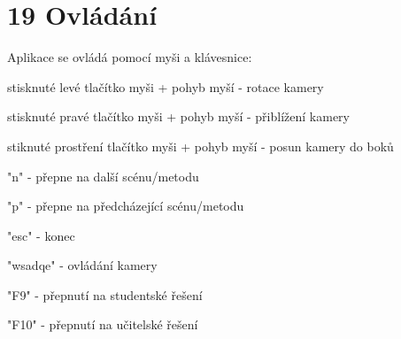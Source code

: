 \chapter{19 Ovládání}
\hypertarget{p19_ovladani}{}\label{p19_ovladani}
Aplikace se ovládá pomocí myši a klávesnice\+:
\begin{DoxyItemize}
\item stisknuté levé tlačítko myši + pohyb myší -\/ rotace kamery
\item stisknuté pravé tlačítko myši + pohyb myší -\/ přiblížení kamery
\item stiknuté prostření tlačítko myši + pohyb myší -\/ posun kamery do boků
\item "{}n"{} -\/ přepne na další scénu/metodu
\item "{}p"{} -\/ přepne na předcházející scénu/metodu
\item "{}esc"{} -\/ konec
\item "{}wsadqe"{} -\/ ovládání kamery
\item "{}\+F9"{} -\/ přepnutí na studentské řešení
\item "{}\+F10"{} -\/ přepnutí na učitelské řešení 
\end{DoxyItemize}